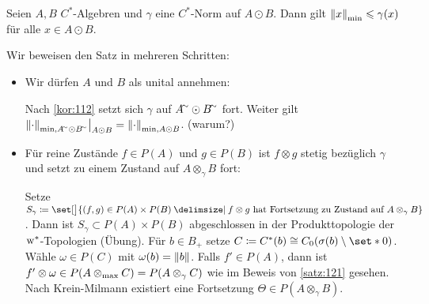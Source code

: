 \begin{satz}[{name=[Die minimale Norm ist minimal]}]
    Seien $A,B$ $C^*$-Algebren und $\gamma$ eine $C^*$-Norm auf $A \odot B$.
    Dann gilt $\norm*{x}_{\min} \le \gamma(x)$ für alle $x \in A \odot B$.
\end{satz}
\begin{beweis}
    Wir beweisen den Satz in mehreren Schritten:
    \begin{itemize}
        \item Wir dürfen $A$ und $B$ als unital annehmen:
        
        Nach \autoref{kor:112} setzt sich $\gamma$ auf $A^\simm \odot B^\simm$ fort.
        Weiter gilt $\norm*{\cdot}_{\min,A^\simm \odot B^\simm}\big|_{A \odot B} = \norm*{\cdot}_{\min, A \odot B}$. (warum?)
        \item Für reine Zustände $f \in P(A)$ und $g \in P(B)$ ist $f \otimes g$ stetig bezüglich $\gamma$ und setzt zu einem Zustand auf $A \otimes_\gamma B$ fort:
        
        Setze $S_\gamma \coloneqq \set[\big]{(f,g) \in P(A) \times P(B) \given f \otimes g \text{ hat Fortsetzung zu Zustand auf } A \otimes_\gamma B}$.
        Dann ist $S_\gamma \subset P(A) \times P(B)$ abgeschlossen in der Produkttopologie der $\w^*$-Topologien (Übung).
        Für $b \in B_+$ setze $C \coloneqq C^*(b) \cong C_0 \enbrace*{\sigma(b) \setminus \set*{0}}$.
        Wähle $\omega \in P(C)$ mit $\omega(b)=\norm*{b}$.
        Falls $f' \in P(A)$, dann ist $f' \otimes \omega \in P(A \tensormax C)= P (A \otimes_\gamma C)$ wie im Beweis von \autoref{satz:121} gesehen.
        Nach Krein-Milmann existiert eine Fortsetzung $\Theta \in P(A \otimes_\gamma B)$.
        

\end{itemize}
\end{beweis}
